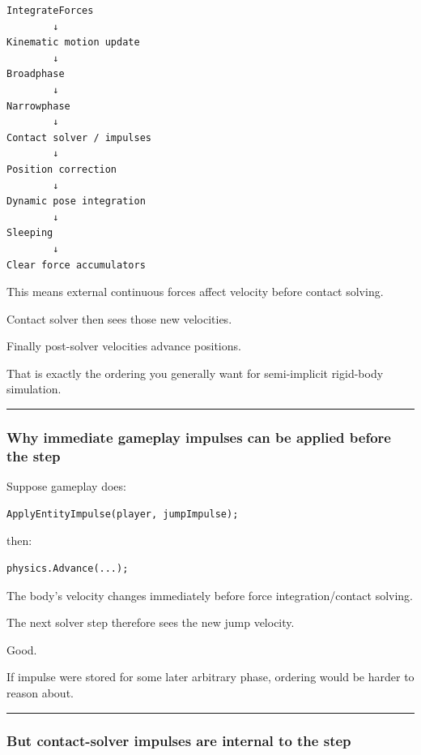 \begin{verbatim}
IntegrateForces
        ↓
Kinematic motion update
        ↓
Broadphase
        ↓
Narrowphase
        ↓
Contact solver / impulses
        ↓
Position correction
        ↓
Dynamic pose integration
        ↓
Sleeping
        ↓
Clear force accumulators
\end{verbatim}

This means external continuous forces affect velocity before contact solving.

Contact solver then sees those new velocities.

Finally post-solver velocities advance positions.

That is exactly the ordering you generally want for semi-implicit rigid-body simulation.

\begin{center}\rule{0.5\linewidth}{0.5pt}\end{center}

\subsubsection{Why immediate gameplay impulses can be applied before the step}\label{why-immediate-gameplay-impulses-can-be-applied-before-the-step}

Suppose gameplay does:

\begin{verbatim}
ApplyEntityImpulse(player, jumpImpulse);
\end{verbatim}

then:

\begin{verbatim}
physics.Advance(...);
\end{verbatim}

The body's velocity changes immediately before force integration/contact solving.

The next solver step therefore sees the new jump velocity.

Good.

If impulse were stored for some later arbitrary phase, ordering would be harder to reason about.

\begin{center}\rule{0.5\linewidth}{0.5pt}\end{center}

\subsubsection{But contact-solver impulses are internal to the step}\label{but-contact-solver-impulses-are-internal-to-the-step}

